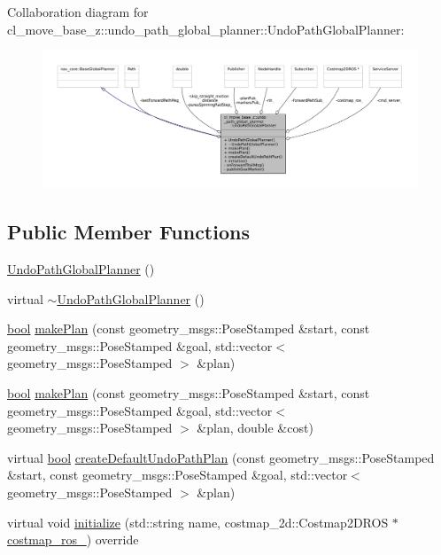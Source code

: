 Collaboration diagram for cl\+\_\+move\+\_\+base\+\_\+z\+:\+:undo\+\_\+path\+\_\+global\+\_\+planner\+:\+:Undo\+Path\+Global\+Planner\+:
\nopagebreak
\begin{figure}[H]
\begin{center}
\leavevmode
\includegraphics[width=350pt]{classcl__move__base__z_1_1undo__path__global__planner_1_1UndoPathGlobalPlanner__coll__graph}
\end{center}
\end{figure}
\subsection*{Public Member Functions}
\begin{DoxyCompactItemize}
\item 
\hyperlink{classcl__move__base__z_1_1undo__path__global__planner_1_1UndoPathGlobalPlanner_aaea18b14afd15cd5160e34a3a829b46f}{Undo\+Path\+Global\+Planner} ()
\item 
virtual \hyperlink{classcl__move__base__z_1_1undo__path__global__planner_1_1UndoPathGlobalPlanner_aae5dcc1ca67cffca6b96fc3d267ba448}{$\sim$\+Undo\+Path\+Global\+Planner} ()
\item 
\hyperlink{classbool}{bool} \hyperlink{classcl__move__base__z_1_1undo__path__global__planner_1_1UndoPathGlobalPlanner_a46034d27c0811abae440009457a7f8b0}{make\+Plan} (const geometry\+\_\+msgs\+::\+Pose\+Stamped \&start, const geometry\+\_\+msgs\+::\+Pose\+Stamped \&goal, std\+::vector$<$ geometry\+\_\+msgs\+::\+Pose\+Stamped $>$ \&plan)
\item 
\hyperlink{classbool}{bool} \hyperlink{classcl__move__base__z_1_1undo__path__global__planner_1_1UndoPathGlobalPlanner_aca09f640e4bda4d5ccc9613276fd3f71}{make\+Plan} (const geometry\+\_\+msgs\+::\+Pose\+Stamped \&start, const geometry\+\_\+msgs\+::\+Pose\+Stamped \&goal, std\+::vector$<$ geometry\+\_\+msgs\+::\+Pose\+Stamped $>$ \&plan, double \&cost)
\item 
virtual \hyperlink{classbool}{bool} \hyperlink{classcl__move__base__z_1_1undo__path__global__planner_1_1UndoPathGlobalPlanner_a659c16f439d33ac7026a54bb65c26ca8}{create\+Default\+Undo\+Path\+Plan} (const geometry\+\_\+msgs\+::\+Pose\+Stamped \&start, const geometry\+\_\+msgs\+::\+Pose\+Stamped \&goal, std\+::vector$<$ geometry\+\_\+msgs\+::\+Pose\+Stamped $>$ \&plan)
\item 
virtual void \hyperlink{classcl__move__base__z_1_1undo__path__global__planner_1_1UndoPathGlobalPlanner_a69e0fbb98872f108f679b2a6620638f5}{initialize} (std\+::string name, costmap\+\_\+2d\+::\+Costmap2\+D\+R\+OS $\ast$\hyperlink{classcl__move__base__z_1_1undo__path__global__planner_1_1UndoPathGlobalPlanner_ab63eeb465e3ae989a6edcc4d059cf8f0}{costmap\+\_\+ros\+\_\+}) override
\end{DoxyCompactItemize}
